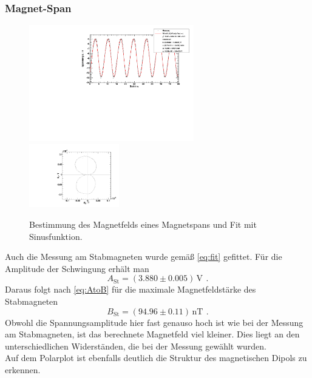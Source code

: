 \subsubsection{Magnet-Span}
\begin{figure}[H]
\begin{center}
  \includegraphics[width=0.64\textwidth]{../img/fit_Magnetspan_45grad.pdf}
  \includegraphics[width=0.35\textwidth]{../img/polar_Magnetspan_45grad.pdf}
  \caption{Bestimmung des Magnetfelds eines Magnetspans und Fit mit Sinusfunktion.}
  \label{img:magnetspan}
\end{center}
\end{figure}
Auch die Messung am Stabmagneten wurde gemäß \autoref{eq:fit} gefittet.
Für die Amplitude der Schwingung erhält man
\begin{equation}
\label{}
A_{\text{St}}=(3.880 \pm 0.005)\, \text{V} \ \, .
\end{equation}
Daraus folgt nach \autoref{eq:AtoB} für die maximale Magnetfeldstärke des Stabmagneten
\begin{equation}
\label{}
B_{\text{St}} = (94.96 \pm 0.11)\,\text{nT} \ \, .
\end{equation}
Obwohl die Spannungsamplitude hier fast genauso hoch ist wie bei der Messung am Stabmagneten,
ist das berechnete Magnetfeld viel kleiner. Dies liegt an den unterschiedlichen Widerständen,
die bei der Messung gewählt wurden.\\ 
Auf dem Polarplot ist ebenfalls deutlich die Struktur des magnetischen Dipols zu erkennen.


